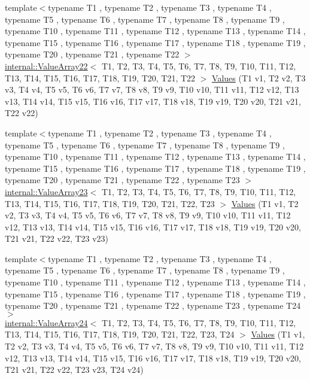 \begin{DoxyCompactItemize}
\item 
{\footnotesize template$<$typename T1 , typename T2 , typename T3 , typename T4 , typename T5 , typename T6 , typename T7 , typename T8 , typename T9 , typename T10 , typename T11 , typename T12 , typename T13 , typename T14 , typename T15 , typename T16 , typename T17 , typename T18 , typename T19 , typename T20 , typename T21 , typename T22 $>$ }\\\mbox{\hyperlink{classtesting_1_1internal_1_1ValueArray22}{internal\+::\+Value\+Array22}}$<$ T1, T2, T3, T4, T5, T6, T7, T8, T9, T10, T11, T12, T13, T14, T15, T16, T17, T18, T19, T20, T21, T22 $>$ \mbox{\hyperlink{namespacetesting_aadfff0d803156b98ff1ffa5f1d95c350}{Values}} (T1 v1, T2 v2, T3 v3, T4 v4, T5 v5, T6 v6, T7 v7, T8 v8, T9 v9, T10 v10, T11 v11, T12 v12, T13 v13, T14 v14, T15 v15, T16 v16, T17 v17, T18 v18, T19 v19, T20 v20, T21 v21, T22 v22)
\item 
{\footnotesize template$<$typename T1 , typename T2 , typename T3 , typename T4 , typename T5 , typename T6 , typename T7 , typename T8 , typename T9 , typename T10 , typename T11 , typename T12 , typename T13 , typename T14 , typename T15 , typename T16 , typename T17 , typename T18 , typename T19 , typename T20 , typename T21 , typename T22 , typename T23 $>$ }\\\mbox{\hyperlink{classtesting_1_1internal_1_1ValueArray23}{internal\+::\+Value\+Array23}}$<$ T1, T2, T3, T4, T5, T6, T7, T8, T9, T10, T11, T12, T13, T14, T15, T16, T17, T18, T19, T20, T21, T22, T23 $>$ \mbox{\hyperlink{namespacetesting_a820991f1c28518a0c218176bd7192de8}{Values}} (T1 v1, T2 v2, T3 v3, T4 v4, T5 v5, T6 v6, T7 v7, T8 v8, T9 v9, T10 v10, T11 v11, T12 v12, T13 v13, T14 v14, T15 v15, T16 v16, T17 v17, T18 v18, T19 v19, T20 v20, T21 v21, T22 v22, T23 v23)
\item 
{\footnotesize template$<$typename T1 , typename T2 , typename T3 , typename T4 , typename T5 , typename T6 , typename T7 , typename T8 , typename T9 , typename T10 , typename T11 , typename T12 , typename T13 , typename T14 , typename T15 , typename T16 , typename T17 , typename T18 , typename T19 , typename T20 , typename T21 , typename T22 , typename T23 , typename T24 $>$ }\\\mbox{\hyperlink{classtesting_1_1internal_1_1ValueArray24}{internal\+::\+Value\+Array24}}$<$ T1, T2, T3, T4, T5, T6, T7, T8, T9, T10, T11, T12, T13, T14, T15, T16, T17, T18, T19, T20, T21, T22, T23, T24 $>$ \mbox{\hyperlink{namespacetesting_a74b2375fe8c3c685e6f7b0b6a9b61009}{Values}} (T1 v1, T2 v2, T3 v3, T4 v4, T5 v5, T6 v6, T7 v7, T8 v8, T9 v9, T10 v10, T11 v11, T12 v12, T13 v13, T14 v14, T15 v15, T16 v16, T17 v17, T18 v18, T19 v19, T20 v20, T21 v21, T22 v22, T23 v23, T24 v24)

\end{DoxyCompactItemize}
